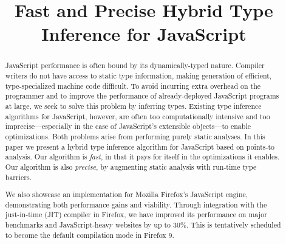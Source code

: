 \documentclass[preprint]{sigplanconf}
\title{Fast and Precise Hybrid Type Inference for JavaScript}
\begin{document}
\maketitle

\begin{abstract}
JavaScript performance is often bound by its dynamically-typed
nature. Compiler writers do not have access to static type information, making
generation of efficient, type-specialized machine code difficult. To avoid
incurring extra overhead on the programmer and to improve the performance of
already-deployed JavaScript programs at large, we seek to solve this problem
by inferring types. Existing type inference algorithms for JavaScript,
however, are often too computationally intensive and too
imprecise---especially in the case of JavaScript's extensible objects---to
enable optimizations. Both problems arise from performing purely static
analyses. In this paper we present a hybrid type inference algorithm for
JavaScript based on points-to analysis. Our algorithm is \emph{fast}, in that
it pays for itself in the optimizations it enables.  Our algorithm is also
\emph{precise}, by augmenting static analysis with run-time type barriers.

We also showcase an implementation for Mozilla Firefox's JavaScript engine,
demonstrating both performance gains and viability.
Through integration with the just-in-time (JIT) compiler in Firefox, we have improved
its performance on major benchmarks and JavaScript-heavy websites by up to 30\%.
This is tentatively scheduled to become the
default compilation mode in Firefox 9.
\end{abstract}

%





%

{}

\end{document}
